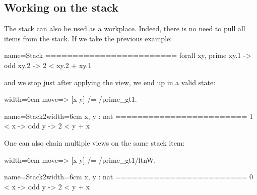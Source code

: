 %

\subsection{Working on the stack}

The stack can also be used as a workplace.  Indeed, there is no need
to pull all items from the stack.  If we take the previous example:

\begin{coqout}{name=Stack}{}
========================
forall xy, prime xy.1 -> odd xy.2 -> 2 < xy.2 + xy.1
\end{coqout}
and we stop just after applying the view, we end up in a valid state:

\begin{coq-left}{}{width=6cm}
move=> [x y] /= /prime_gt1.
$~$
$~$
\end{coq-left}
\begin{coqout-right}{name=Stack2}{width=6cm}
 x, y : nat
 ========================
 1 < x -> odd y -> 2 < y + x
\end{coqout-right}

One can also chain multiple views on the same stack item:

\begin{coq-left}{}{width=6cm}
move=> [x y] /= /prime_gt1/ltnW.
$~$
$~$
\end{coq-left}
\begin{coqout-right}{name=Stack2}{width=6cm}
 x, y : nat
 ========================
 0 < x -> odd y -> 2 < y + x
\end{coqout-right}

